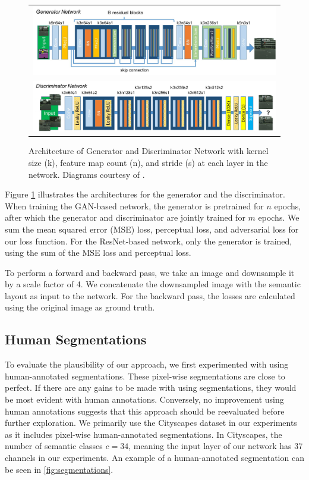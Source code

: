 \documentclass[10pt,twocolumn,letterpaper]{article}
\begin{document}
\begin{figure}[ht!]
\begin{center}
    \begin{tabular}{c}
	\includegraphics[width=6.5in]{images/generator_architecture.png} \\
	\includegraphics[width=6.5in]{images/discriminator_architecture.png}
    \end{tabular}
\end{center}
    \caption{Architecture of Generator and Discriminator Network with kernel
    size (k), feature map count (n), and stride (s) at each layer in the
    network. Diagrams courtesy of \cite{SRGAN}.}
    \label{fig:architecture}
\end{figure}

Figure \ref{fig:architecture} illustrates the architectures for the generator and
the discriminator. When training the GAN-based network, the generator is
pretrained for $n$ epochs, after which the generator and discriminator are
jointly trained for $m$ epochs. We sum the mean squared error (MSE) loss,
perceptual loss, and adversarial loss for our loss function. For the
ResNet-based network, only the generator is trained, using the sum of the MSE
loss and perceptual loss.

To perform a forward and backward pass, we take an image and downsample it by a
scale factor of 4. We concatenate the downsampled image with the semantic
layout as input to the network. For the backward pass, the losses are
calculated using the original image as ground truth.

\subsection{Human Segmentations}
To evaluate the plausibility of our approach, we first experimented with using
human-annotated segmentations. These pixel-wise segmentations are close to
perfect. If there are any gains to be made with using segmentations, they would
be most evident with human annotations. Conversely, no improvement using human
annotations suggests that this approach should be reevaluated before further
exploration. We primarily use the Cityscapes \cite{Cityscapes} dataset in our
experiments as it includes pixel-wise human-annotated segmentations. In
Cityscapes, the number of semantic classes $c = 34$, meaning the input layer of
our network has 37 channels in our experiments. An example of a human-annotated
segmentation can be seen in \ref{fig:segmentations}.
\end{document}
